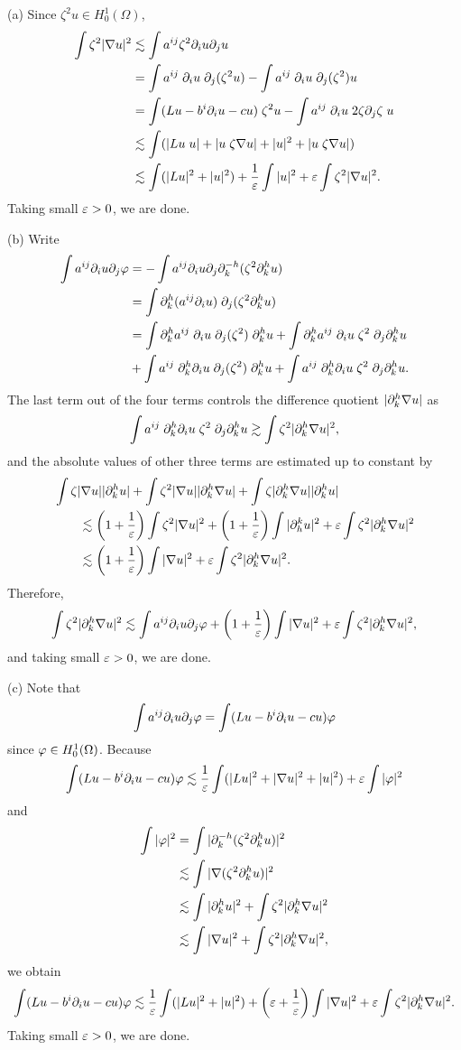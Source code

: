 \documentclass{../note}
\begin{document}
\begin{pf}
(a)
Since $\zeta^2u\in H_0^1(\Omega)$,
\begin{align*}
\int\zeta^2|\nabla u|^2
&\lesssim\int a^{ij}\zeta^2\pd_iu\pd_ju\\
&=\int a^{ij}\;\pd_iu\;\pd_j(\zeta^2u)-\int a^{ij}\;\pd_iu\;\pd_j(\zeta^2)u\\
&=\int(Lu-b^i\pd_iu-cu)\;\zeta^2u-\int a^{ij}\;\pd_iu\;2\zeta\pd_j\zeta\;u\\
&\lesssim\int(|Lu\;u|+|u\;\zeta\nabla u|+|u|^2+|u\;\zeta\nabla u|)\\
&\lesssim\int(|Lu|^2+|u|^2)+\frac1\e\int|u|^2+\e\int\zeta^2|\nabla u|^2.
\end{align*}
Taking small $\varepsilon>0$, we are done.

(b)
Write
\begin{align*}
\int a^{ij}\pd_iu\pd_j\f
&=-\int a^{ij}\pd_iu\pd_j\pd_k^{-h}(\zeta^2\pd_k^hu)\\
&=\int\pd_k^h(a^{ij}\pd_iu)\;\pd_j(\zeta^2\pd_k^hu)\\
&=\int\pd_k^ha^{ij}\;\pd_iu\;\pd_j(\zeta^2)\;\pd_k^hu
+\int\pd_k^ha^{ij}\;\pd_iu\;\zeta^2\;\pd_j\pd_k^hu\\
&+\int a^{ij}\;\pd_k^h\pd_iu\;\pd_j(\zeta^2)\;\pd_k^hu
+\int a^{ij}\;\pd_k^h\pd_iu\;\zeta^2\;\pd_j\pd_k^hu.
\end{align*}
The last term out of the four terms controls the difference quotient $|\pd_k^h\nabla u|$ as
\[\int a^{ij}\;\pd_k^h\pd_iu\;\zeta^2\;\pd_j\pd_k^hu\gtrsim\int\zeta^2|\pd_k^h\nabla u|^2,\]
and the absolute values of other three terms are estimated up to constant by
\begin{align*}
&\int\zeta|\nabla u||\pd_k^h u|+\int\zeta^2|\nabla u||\pd_k^h\nabla u|+\int\zeta|\pd_k^h\nabla u||\pd_k^hu|\\
&\qquad\lesssim
\left(1+\frac1\e\right)\int\zeta^2|\nabla u|^2+\left(1+\frac1\e\right)\int|\pd_h^ku|^2+\e\int\zeta^2|\pd_k^h\nabla u|^2\\
&\qquad\lesssim
\left(1+\frac1\e\right)\int|\nabla u|^2+\e\int\zeta^2|\pd_k^h\nabla u|^2.
\end{align*}
Therefore,
\[\int\zeta^2|\pd_k^h\nabla u|^2\lesssim\int a^{ij}\pd_iu\pd_j\f+\left(1+\frac1\e\right)\int|\nabla u|^2+\e\int\zeta^2|\pd_k^h\nabla u|^2,\]
and taking small $\varepsilon>0$, we are done.

(c)
Note that
\[\int a^{ij}\pd_iu\pd_j\f=\int(Lu-b^i\pd_iu-cu)\f\]
since $\varphi\in H_0^1(\Omega)$.
Because
\[\int(Lu-b^i\pd_iu-cu)\f
\lesssim\frac1\e\int(|Lu|^2+|\nabla u|^2+|u|^2)+\e\int|\f|^2\]
and
\begin{align*}
\int|\f|^2&=\int|\pd_k^{-h}(\zeta^2\pd_k^hu)|^2\\
&\lesssim\int|\nabla(\zeta^2\pd_k^hu)|^2\\
&\lesssim\int|\pd_k^hu|^2+\int\zeta^2|\pd_k^h\nabla u|^2\\
&\lesssim\int|\nabla u|^2+\int\zeta^2|\pd_k^h\nabla u|^2,
\end{align*}
we obtain
\[\int(Lu-b^i\pd_iu-cu)\f
\lesssim\frac1\e\int(|Lu|^2+|u|^2)+\left(\e+\frac1\e\right)\int|\nabla u|^2+\e\int\zeta^2|\pd_k^h\nabla u|^2.\]
Taking small $\varepsilon>0$, we are done.
\end{pf}
\end{document}
